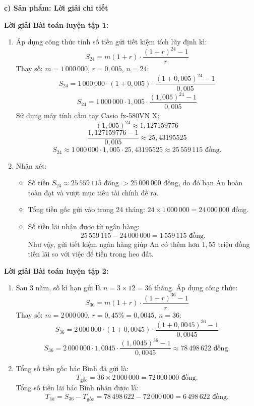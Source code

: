 \documentclass[12pt, a4paper]{article}
\begin{document}
\noindent \textbf{c) Sản phẩm: Lời giải chi tiết}

\noindent \textbf{Lời giải Bài toán luyện tập 1:}
\begin{enumerate}
    \item Áp dụng công thức tính số tiền gửi tiết kiệm tích lũy định kì:
    $$S_{24} = m(1+r) \cdot \dfrac{(1+r)^{24} - 1}{r}$$
    Thay số: $m = 1\,000\,000$, $r = 0{,}005$, $n = 24$:
    $$S_{24} = 1\,000\,000 \cdot (1 + 0{,}005) \cdot \dfrac{(1 + 0{,}005)^{24} - 1}{0{,}005}$$
    $$S_{24} = 1\,000\,000 \cdot 1{,}005 \cdot \dfrac{(1{,}005)^{24} - 1}{0{,}005}$$
    Sử dụng máy tính cầm tay Casio fx-580VN X:
    $$(1{,}005)^{24} \approx 1{,}127159776$$
    $$\dfrac{1{,}127159776 - 1}{0{,}005} \approx 25{,}43195525$$
    $$S_{24} \approx 1\,000\,000 \cdot 1{,}005 \cdot 25{,}43195525 \approx 25\,559\,115\text{ đồng.}$$
    \item Nhận xét:
    \begin{itemize}
        \item Số tiền $S_{24} \approx 25\,559\,115$ đồng $> 25\,000\,000$ đồng, do đó bạn An hoàn toàn đạt và vượt mục tiêu tài chính đề ra.
        \item Tổng tiền gốc gửi vào trong 24 tháng: $24 \times 1\,000\,000 = 24\,000\,000$ đồng.
        \item Số tiền lãi nhận được từ ngân hàng:
        $$25\,559\,115 - 24\,000\,000 = 1\,559\,115\text{ đồng.}$$
        Như vậy, gửi tiết kiệm ngân hàng giúp An có thêm hơn $1{,}55$ triệu đồng tiền lãi so với việc để tiền trong heo đất.
    \end{itemize}
\end{enumerate}

\noindent \textbf{Lời giải Bài toán luyện tập 2:}
\begin{enumerate}
    \item Sau 3 năm, số kì hạn gửi là $n = 3 \times 12 = 36$ tháng.
    Áp dụng công thức:
    $$S_{36} = m(1+r) \cdot \dfrac{(1+r)^{36} - 1}{r}$$
    Thay số: $m = 2\,000\,000$, $r = 0{,}45\% = 0{,}0045$, $n = 36$:
    $$S_{36} = 2\,000\,000 \cdot (1 + 0{,}0045) \cdot \dfrac{(1 + 0{,}0045)^{36} - 1}{0{,}0045}$$
    $$S_{36} = 2\,000\,000 \cdot 1{,}0045 \cdot \dfrac{(1{,}0045)^{36} - 1}{0{,}0045} \approx 78\,498\,622\text{ đồng.}$$
    \item Tổng số tiền gốc bác Bình đã gửi là:
    $$T_{\text{gốc}} = 36 \times 2\,000\,000 = 72\,000\,000\text{ đồng.}$$
    Tổng số tiền lãi bác Bình nhận được là:
    $$T_{\text{lãi}} = S_{36} - T_{\text{gốc}} = 78\,498\,622 - 72\,000\,000 = 6\,498\,622\text{ đồng.}$$
\end{enumerate}
\end{document}
